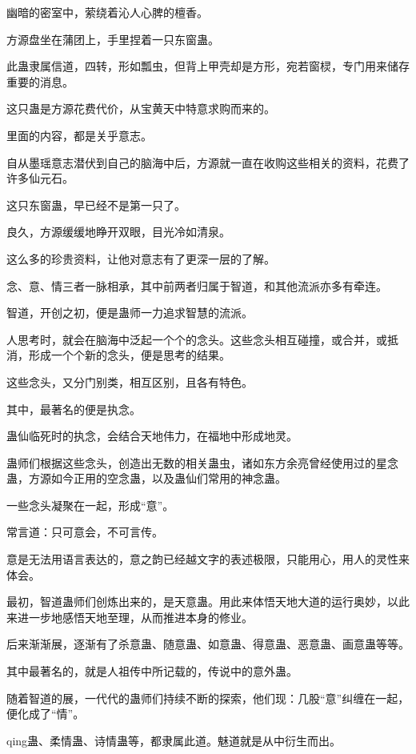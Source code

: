 
\begin{this_body}

幽暗的密室中，萦绕着沁人心脾的檀香。

方源盘坐在蒲团上，手里捏着一只东窗蛊。

此蛊隶属信道，四转，形如瓢虫，但背上甲壳却是方形，宛若窗棂，专门用来储存重要的消息。

这只蛊是方源花费代价，从宝黄天中特意求购而来的。

里面的内容，都是关乎意志。

自从墨瑶意志潜伏到自己的脑海中后，方源就一直在收购这些相关的资料，花费了许多仙元石。

这只东窗蛊，早已经不是第一只了。

良久，方源缓缓地睁开双眼，目光冷如清泉。

这么多的珍贵资料，让他对意志有了更深一层的了解。

念、意、情三者一脉相承，其中前两者归属于智道，和其他流派亦多有牵连。

智道，开创之初，便是蛊师一力追求智慧的流派。

人思考时，就会在脑海中泛起一个个的念头。这些念头相互碰撞，或合并，或抵消，形成一个个新的念头，便是思考的结果。

这些念头，又分门别类，相互区别，且各有特色。

其中，最著名的便是执念。

蛊仙临死时的执念，会结合天地伟力，在福地中形成地灵。

蛊师们根据这些念头，创造出无数的相关蛊虫，诸如东方余亮曾经使用过的星念蛊，方源如今正用的空念蛊，以及蛊仙们常用的神念蛊。

一些念头凝聚在一起，形成“意”。

常言道：只可意会，不可言传。

意是无法用语言表达的，意之韵已经越文字的表述极限，只能用心，用人的灵性来体会。

最初，智道蛊师们创炼出来的，是天意蛊。用此来体悟天地大道的运行奥妙，以此来进一步地感悟天地至理，从而推进本身的修业。

后来渐渐展，逐渐有了杀意蛊、随意蛊、如意蛊、得意蛊、恶意蛊、画意蛊等等。

其中最著名的，就是人祖传中所记载的，传说中的意外蛊。

随着智道的展，一代代的蛊师们持续不断的探索，他们现：几股“意”纠缠在一起，便化成了“情”。

qing蛊、柔情蛊、诗情蛊等，都隶属此道。魅道就是从中衍生而出。


\end{this_body}
